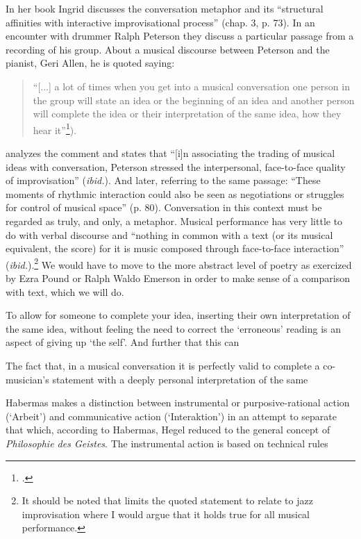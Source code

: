 In her book Ingrid \citeauthor{monson96} discusses the conversation metaphor and its ``structural affinities with interactive improvisational process'' (chap. 3, p. 73). In an encounter with drummer Ralph Peterson they discuss a particular passage from a recording of his group. About a musical discourse between Peterson and the pianist, Geri Allen, he is quoted saying: 
\begin{quotation}
  ``[...] a lot of times when you get into a musical conversation one person in the group will state an idea or the beginning of an idea and another person will complete the idea or their interpretation of the same idea, how they hear it''\footcite[Ralph Peterson as cited in][78]{monson96}).
\end{quotation}
\citeauthor{monson96} analyzes the comment and states that ``[i]n associating the trading of musical ideas with conversation, Peterson stressed the interpersonal, face-to-face quality of improvisation'' (\textit{ibid.}). And later, referring to the same passage: ``These moments of rhythmic interaction could also be seen as negotiations or struggles for control of musical space'' (p. 80). Conversation in this context must be regarded as truly, and only, a metaphor. Musical performance has very little to do with verbal discourse and ``nothing in common with a text (or its musical equivalent, the score) for it is music composed through face-to-face interaction'' (\textit{ibid.}).\footnote{It should be noted that   \citeauthor{monson96} limits the quoted statement to relate to jazz   improvisation where I would argue that it holds true for all musical   performance.} We would have to move to the more abstract level of poetry as exercized by Ezra Pound or Ralph Waldo Emerson in order to make sense of a comparison with text, which we will do. 

To allow for someone to complete your idea, inserting their own interpretation of the same idea, without feeling the need to correct the `erroneous' reading is an aspect of giving up `the self'. And further that this can 

The fact that, in a musical conversation it is perfectly valid to complete a co-musician's statement with a deeply personal interpretation of the same

Habermas makes a distinction between instrumental or purposive-rational action (`Arbeit') and communicative action (`Interaktion') in an attempt to separate that which, according to Habermas, Hegel reduced to the general concept of \emph{Philosophie   des Geistes}. The instrumental action is based on technical rules 

